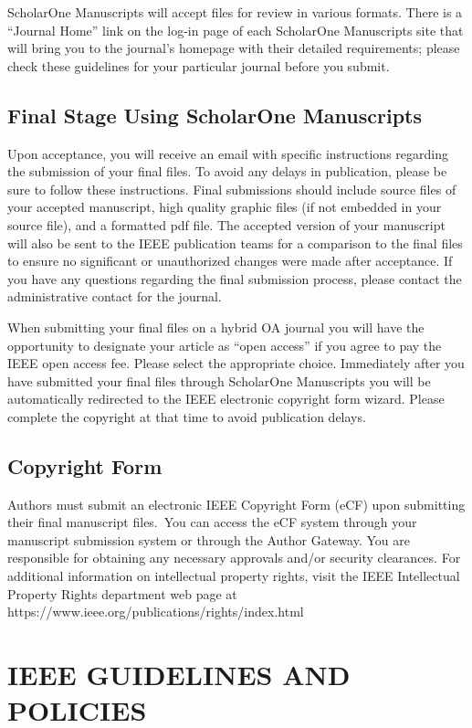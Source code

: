 \documentclass[correspondence]{IEEEtaes}
\begin{document}
ScholarOne Manuscripts will accept files for review in various formats. There is a ``Journal Home'' link on the log-in page of each ScholarOne Manuscripts site that will bring you to the journal's homepage with their detailed requirements; please check these guidelines for your particular journal before you submit.

\subsection{Final Stage Using ScholarOne Manuscripts}

Upon acceptance, you will receive an email with specific instructions regarding the submission of your final files. To avoid any delays in publication, please be sure to follow these instructions. Final submissions should include source files of your accepted manuscript, high quality graphic files (if not embedded in your source file), and a formatted pdf file. The accepted version of your manuscript will also be sent to the IEEE publication teams for a comparison to the final files to ensure no significant or unauthorized changes were made after acceptance. If you have any questions regarding the final submission process, please contact the administrative contact for the journal.

When submitting your final files on a hybrid OA journal you will have the opportunity to designate your article as ``open access'' if you agree to pay the IEEE open access fee. Please select the appropriate choice. Immediately after you have submitted your final files through ScholarOne Manuscripts you will be automatically redirected to the IEEE electronic copyright form wizard. Please complete the copyright at that time to avoid publication delays.

\subsection{Copyright Form}

Authors must submit an electronic IEEE Copyright Form (eCF) upon submitting their final manuscript files.~You can access the eCF system through your manuscript submission system or through the Author Gateway. You are responsible for obtaining any necessary approvals and/or security clearances. For additional information on intellectual property rights, visit the IEEE Intellectual Property Rights department web page at {{https://www.ieee.org/publications/rights/index.html}}

\section{IEEE GUIDELINES AND POLICIES}
\end{document}
